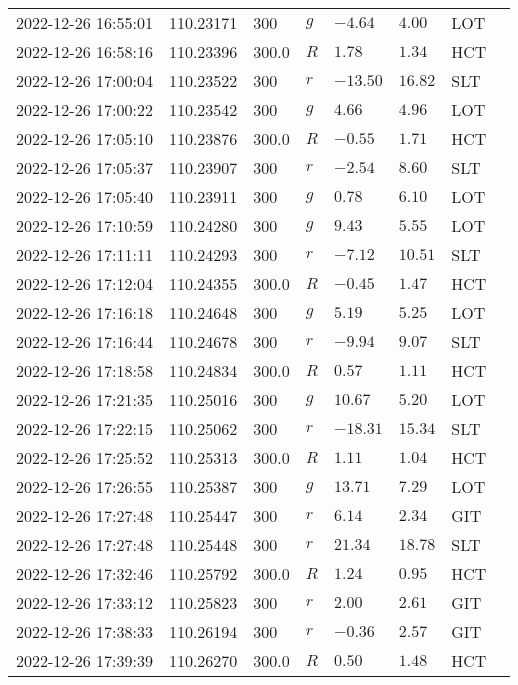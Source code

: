 \documentclass{nature_plusfigure}
\begin{document}
\begin{supplement}
\begin{center}
\begin{longtable}{llllllll}
2022-12-26 16:55:01 & 110.23171 & 300 & $g$ & $-4.64$ & $4.00$ & LOT &  \\ 
2022-12-26 16:58:16 & 110.23396 & 300.0 & $R$ & $1.78$ & $1.34$ & HCT &  \\ 
2022-12-26 17:00:04 & 110.23522 & 300 & $r$ & $-13.50$ & $16.82$ & SLT &  \\ 
2022-12-26 17:00:22 & 110.23542 & 300 & $g$ & $4.66$ & $4.96$ & LOT &  \\ 
2022-12-26 17:05:10 & 110.23876 & 300.0 & $R$ & $-0.55$ & $1.71$ & HCT &  \\ 
2022-12-26 17:05:37 & 110.23907 & 300 & $r$ & $-2.54$ & $8.60$ & SLT &  \\ 
2022-12-26 17:05:40 & 110.23911 & 300 & $g$ & $0.78$ & $6.10$ & LOT &  \\ 
2022-12-26 17:10:59 & 110.24280 & 300 & $g$ & $9.43$ & $5.55$ & LOT &  \\ 
2022-12-26 17:11:11 & 110.24293 & 300 & $r$ & $-7.12$ & $10.51$ & SLT &  \\ 
2022-12-26 17:12:04 & 110.24355 & 300.0 & $R$ & $-0.45$ & $1.47$ & HCT &  \\ 
2022-12-26 17:16:18 & 110.24648 & 300 & $g$ & $5.19$ & $5.25$ & LOT &  \\ 
2022-12-26 17:16:44 & 110.24678 & 300 & $r$ & $-9.94$ & $9.07$ & SLT &  \\ 
2022-12-26 17:18:58 & 110.24834 & 300.0 & $R$ & $0.57$ & $1.11$ & HCT &  \\ 
2022-12-26 17:21:35 & 110.25016 & 300 & $g$ & $10.67$ & $5.20$ & LOT &  \\ 
2022-12-26 17:22:15 & 110.25062 & 300 & $r$ & $-18.31$ & $15.34$ & SLT &  \\ 
2022-12-26 17:25:52 & 110.25313 & 300.0 & $R$ & $1.11$ & $1.04$ & HCT &  \\ 
2022-12-26 17:26:55 & 110.25387 & 300 & $g$ & $13.71$ & $7.29$ & LOT &  \\ 
2022-12-26 17:27:48 & 110.25447 & 300 & $r$ & $6.14$ & $2.34$ & GIT &  \\ 
2022-12-26 17:27:48 & 110.25448 & 300 & $r$ & $21.34$ & $18.78$ & SLT &  \\ 
2022-12-26 17:32:46 & 110.25792 & 300.0 & $R$ & $1.24$ & $0.95$ & HCT &  \\ 
2022-12-26 17:33:12 & 110.25823 & 300 & $r$ & $2.00$ & $2.61$ & GIT &  \\ 
2022-12-26 17:38:33 & 110.26194 & 300 & $r$ & $-0.36$ & $2.57$ & GIT &  \\ 
2022-12-26 17:39:39 & 110.26270 & 300.0 & $R$ & $0.50$ & $1.48$ & HCT &  \\ 

\end{longtable}
\end{center}
\end{supplement}
\end{document}
